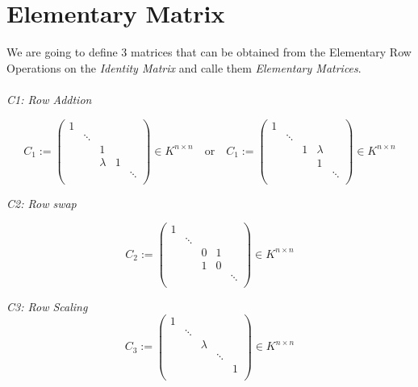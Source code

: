 \section{Elementary Matrix}

We are going to define 3 matrices that can be obtained from the Elementary Row
Operations on the \emph{Identity Matrix} and calle them \emph{Elementary Matrices}.
\\\\
\emph{C1: Row Addtion}

\[
C_1 := 
\begin{pmatrix}
1      &        &        &        &        \\
       & \ddots &        &        &        \\
       &        & 1      &        &        \\
       &        & \lambda & 1     &        \\
       &        &        &        & \ddots \\
\end{pmatrix}
\in K^{n \times n}
\quad \text{or} \quad
C_1 := 
\begin{pmatrix}
1      &        &        &        &        \\
       & \ddots &        &        &        \\
       &        & 1      & \lambda &        \\
       &        &        & 1      &        \\
       &        &        &        & \ddots \\
\end{pmatrix}
\in K^{n \times n}
\]


\emph{C2: Row swap}

\[
C_2 := 
\begin{pmatrix}
1      &        &        &        &        \\
       & \ddots &        &        &        \\
       &        & 0      & 1      &        \\
       &        & 1      & 0      &        \\
       &        &        &        & \ddots \\
\end{pmatrix}
\in K^{n \times n}
\]


\emph{C3: Row Scaling}
\[
C_3 := 
\begin{pmatrix}
1      &        &        &        &        \\
       & \ddots &        &        &        \\
       &        & \lambda &       &        \\
       &        &        & \ddots &        \\
       &        &        &        & 1      \\
\end{pmatrix}
\in K^{n \times n}
\]

